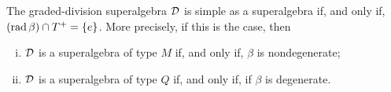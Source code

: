     



\begin{cor}\label{cor:tilde-beta-nondeg}
    The graded-division superalgebra $\mathcal{D}$ is simple as a superalgebra if, and only if, $(\operatorname{rad} \beta) \cap T^+ = \{e\}$. 
    More precisely, if this is the case, then
    \begin{enumerate}[(i)]
        \item $\mathcal{D}$ is a superalgebra of type $M$ if, and only if, $\beta$ is nondegenerate;
        \item $\mathcal{D}$ is a superalgebra of type $Q$ if, and only if, if $\beta$ is degenerate.
    \end{enumerate}
\end{cor}

